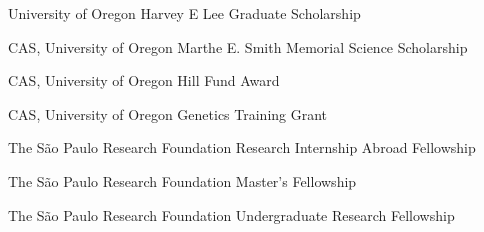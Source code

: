 {%
	University of Oregon}
{%
	Harvey E Lee Graduate Scholarship
}
{\phantom{This text will be invisible}}

{%
	CAS, University of Oregon}
{%
	Marthe E. Smith Memorial Science Scholarship}
{\phantom{This text will be invisible}}

{%
	CAS, University of Oregon}
{%
	Hill Fund Award}
{\phantom{This text will be invisible}}

{%
	CAS, University of Oregon}
{%
	Genetics Training Grant}
{\phantom{This text will be invisible}}

{%
	The São Paulo Research Foundation}
{%
	Research Internship Abroad Fellowship}
{\phantom{This text will be invisible}}

{%
	The São Paulo Research Foundation}
{%
	Master's Fellowship}
{\phantom{This text will be invisible}}

{%
	The São Paulo Research Foundation}
{%
	Undergraduate Research Fellowship}
{\phantom{This text will be invisible}}
